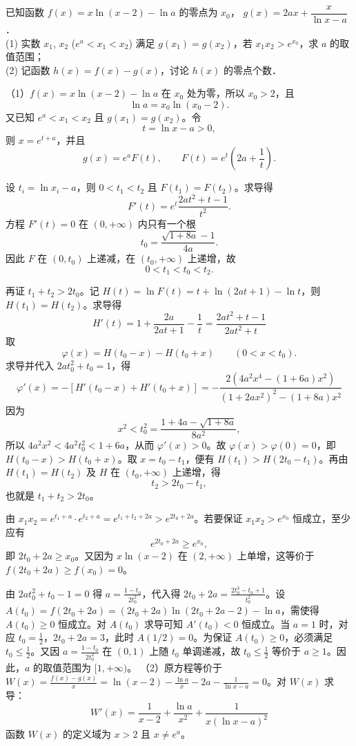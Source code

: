 \begin{example}[零点与导数题]
已知函数 $f(x)=x\ln(x-2)-\ln a$ 的零点为 $x_0$， $g(x)=2ax+\dfrac{x}{\ln x-a}$．  \\
(1) 实数 $x_1$, $x_2$ ($e^a<x_1<x_2$) 满足 $g(x_1)=g(x_2)$，若 $x_1x_2>e^{x_0}$，求 $a$ 的取值范围；  \\
(2) 记函数 $h(x)=f(x)-g(x)$，讨论 $h(x)$ 的零点个数．
\end{example}
\begin{solution}
（1）$f(x)=x\ln(x-2)-\ln a$ 在 $x_0$ 处为零，所以 $x_0>2$，且
\[
\ln a=x_0\ln(x_0-2).
\]
又已知 $e^a<x_1<x_2$ 且 $g(x_1)=g(x_2)$。令
\[
t=\ln x-a>0,
\]
则 $x=e^{t+a}$，并且
\[
g(x)=e^aF(t),\qquad F(t)=e^t\left(2a+\frac1t\right).
\]

设 $t_i=\ln x_i-a$，则 $0<t_1<t_2$ 且 $F(t_1)=F(t_2)$。求导得
\[
F'(t)=e^t\frac{2at^2+t-1}{t^2}.
\]
方程 $F'(t)=0$ 在 $(0,+\infty)$ 内只有一个根
\[
t_0=\frac{\sqrt{1+8a}-1}{4a}.
\]
因此 $F$ 在 $(0,t_0)$ 上递减，在 $(t_0,+\infty)$ 上递增，故
\[
0<t_1<t_0<t_2.
\]

再证 $t_1+t_2>2t_0$。记 $H(t)=\ln F(t)=t+\ln(2at+1)-\ln t$，则 $H(t_1)=H(t_2)$。求导得
$$H'(t) = 1 + \frac{2a}{2at+1} - \frac{1}{t} = \frac{2at^2+t-1}{2at^2+t}$$
取
\[
\varphi(x)=H(t_0-x)-H(t_0+x)\qquad(0<x<t_0).
\]
求导并代入 $2at_0^2+t_0=1$，得
$$\varphi'(x) = - \left[ H'(t_0-x) + H'(t_0+x) \right] = -\frac{2(4a^2x^4 - (1+6a)x^2)}{(1+2ax^2)^2 - (1+8a)x^2}$$
因为
\[
x^2<t_0^2=\frac{1+4a-\sqrt{1+8a}}{8a^2},
\]
所以 \(4a^2x^2<4a^2t_0^2<1+6a\)，从而 \(\varphi'(x)>0\)。故 \(\varphi(x)>\varphi(0)=0\)，即 \(H(t_0-x)>H(t_0+x)\)。取 \(x=t_0-t_1\)，便有 \(H(t_1)>H(2t_0-t_1)\)。再由 \(H(t_1)=H(t_2)\) 及 \(H\) 在 \((t_0,+\infty)\) 上递增，得
\[
t_2>2t_0-t_1,
\]
也就是 \(t_1+t_2>2t_0\)。

由 $x_1 x_2 = e^{t_1+a} \cdot e^{t_2+a} = e^{t_1+t_2+2a}> e^{2t_0+2a}$。若要保证 $x_1 x_2 > e^{x_0}$ 恒成立，至少应有
\[
e^{2t_0+2a} \geqslant e^{x_0},
\]
即 $2t_0 + 2a \geqslant x_0$。又因为 $x\ln(x-2)$ 在 $(2,+\infty)$ 上单增，这等价于 $f(2t_0+2a) \geqslant f(x_0) = 0$。

由 $2at_0^2+t_0-1=0$ 得 $a = \frac{1-t_0}{2t_0^2}$，代入得 $2t_0+2a = \frac{2t_0^3 - t_0 + 1}{t_0^2}$。设 $A(t_0) = f(2t_0+2a) = (2t_0+2a) \ln(2t_0+2a-2) - \ln a$，需使得 $A(t_0) \geqslant 0$ 恒成立。对 $A(t_0)$ 求导可知 $A'(t_0) < 0$ 恒成立。当 $a = 1$ 时，对应 $t_0 = \frac{1}{2}$，$2t_0+2a = 3$，此时 $A(1/2) = 0$。为保证 $A(t_0) \geqslant 0$，必须满足 $t_0 \le \frac{1}{2}$。又因 $a = \frac{1-t_0}{2t_0^2}$ 在 $(0, 1)$ 上随 $t_0$ 单调递减，故 $t_0 \le \frac{1}{2}$ 等价于 $a \geqslant 1$。因此，$a$ 的取值范围为 $[1, +\infty)$。
\newpage
（2）原方程等价于 $W(x) = \frac{f(x) - g(x)}{x} = \ln(x-2) - \frac{\ln a}{x} - 2a - \frac{1}{\ln x - a} = 0$。对 $W(x)$ 求导：
$$W'(x) = \frac{1}{x-2} + \frac{\ln a}{x^2} + \frac{1}{x(\ln x - a)^2}$$
函数 $W(x)$ 的定义域为 $x>2$ 且 $x\ne e^a$。


\end{solution}

